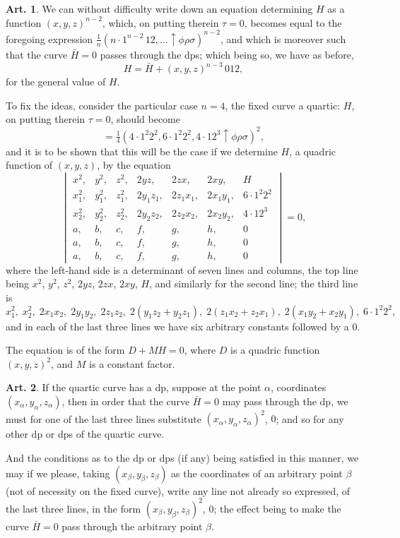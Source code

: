 \documentclass[12pt,a4paper]{article}
\theoremstyle{definition}
\newtheorem{art}{Art.}[section]
\begin{document}
\begin{art}\label{art:43}
We can without difficulty write down an equation determining $H$ as a function $(x, y, z)^{n-2}$, which, on putting therein $\tau = 0$, becomes equal to the foregoing expression $\frac{1}{n}(n \cdot 1^{n-2}\,12, \ldots \uparrow\phi\rho\sigma)^{n-2}$, and which is moreover such that the curve $\bar{H} = 0$ passes through the dps; which being so, we have as before,
\[
H = \bar{H} + (x, y, z)^{n-3}\,012,
\]
for the general value of $H$.

To fix the ideas, consider the particular case $n = 4$, the fixed curve a quartic: $H$, on putting therein $\tau = 0$, should become
\[
= \tfrac{1}{4}(4 \cdot 1^2 2^2, 6 \cdot 1^2 2^2, 4 \cdot 12^3 \uparrow\phi\rho\sigma)^2,
\]
and it is to be shown that this will be the case if we determine $H$, a quadric function of $(x, y, z)$, by the equation
\[
\begin{vmatrix}
x^2, & y^2, & z^2, & 2yz, & 2zx, & 2xy, & H \\
x_1^2, & y_1^2, & z_1^2, & 2y_1z_1, & 2z_1x_1, & 2x_1y_1, & 6 \cdot 1^2 2^2 \\
x_2^2, & y_2^2, & z_2^2, & 2y_2z_2, & 2z_2x_2, & 2x_2y_2, & 4 \cdot 12^3 \\
a, & b, & c, & f, & g, & h, & 0 \\
a, & b, & c, & f, & g, & h, & 0 \\
a, & b, & c, & f, & g, & h, & 0
\end{vmatrix} = 0,
\]
where the left-hand side is a determinant of seven lines and columns, the top line being $x^2$, $y^2$, $z^2$, $2yz$, $2zx$, $2xy$, $H$, and similarly for the second line; the third line is
\[
x_1^2,\; x_2^2,\; 2x_1x_2,\; 2y_1y_2,\; 2z_1z_2,\; 2(y_1z_2 + y_2z_1),\; 2(z_1x_2 + z_2x_1),\; 2(x_1y_2 + x_2y_1),\; 6 \cdot 1^2 2^2,
\]
and in each of the last three lines we have six arbitrary constants followed by a $0$.

The equation is of the form $D + MH = 0$, where $D$ is a quadric function $(x, y, z)^2$, and $M$ is a constant factor.
\end{art}

\newpage
\begin{art}\label{art:44}
If the quartic curve has a dp, suppose at the point $\alpha$, coordinates $(x_\alpha, y_\alpha, z_\alpha)$, then in order that the curve $\bar{H} = 0$ may pass through the dp, we must for one of the last three lines substitute $(x_\alpha, y_\alpha, z_\alpha)^2$, $0$; and so for any other dp or dps of the quartic curve.

And the conditions as to the dp or dps (if any) being satisfied in this manner, we may if we please, taking $(x_\beta, y_\beta, z_\beta)$ as the coordinates of an arbitrary point $\beta$ (not of necessity on the fixed curve), write any line not already so expressed, of the last three lines, in the form $(x_\beta, y_\beta, z_\beta)^2$, $0$; the effect being to make the curve $\bar{H} = 0$ pass through the arbitrary point $\beta$.
\end{art}
\end{document}

